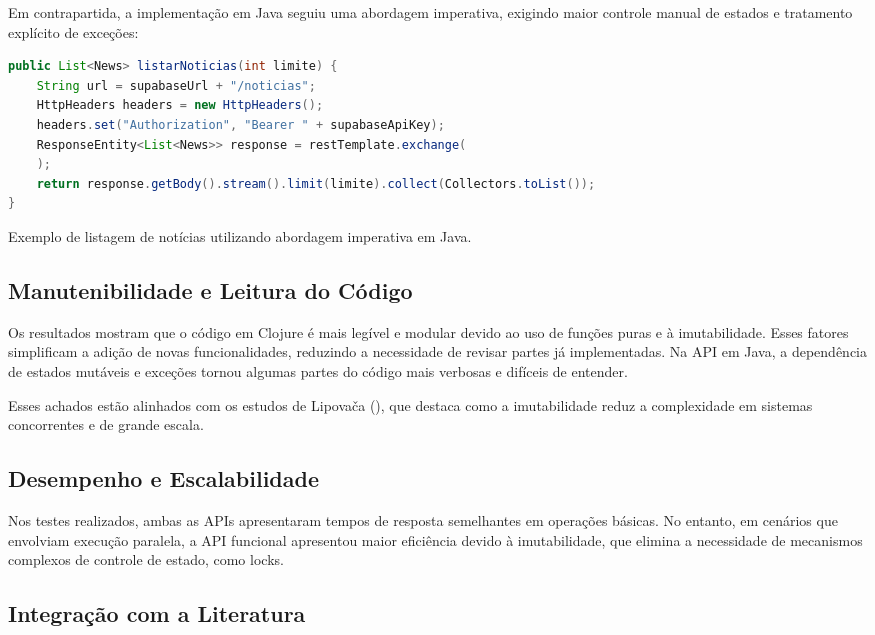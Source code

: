 Em contrapartida, a implementação em Java seguiu uma abordagem imperativa, exigindo maior controle manual de estados e tratamento explícito de exceções:

\begin{tcolorbox}[colback=gray!5!white, colframe=gray!75!black, title={Trecho de Código - Listagem de Notícias em Java}]
\begin{lstlisting}[language=Java]
public List<News> listarNoticias(int limite) {
    String url = supabaseUrl + "/noticias";
    HttpHeaders headers = new HttpHeaders();
    headers.set("Authorization", "Bearer " + supabaseApiKey);
    ResponseEntity<List<News>> response = restTemplate.exchange(
    );
    return response.getBody().stream().limit(limite).collect(Collectors.toList());
}
\end{lstlisting}
\caption{Exemplo de listagem de notícias utilizando abordagem imperativa em Java.}
\end{tcolorbox}

\subsection{Manutenibilidade e Leitura do Código}

Os resultados mostram que o código em Clojure é mais legível e modular devido ao uso de funções puras e à imutabilidade. Esses fatores simplificam a adição de novas funcionalidades, reduzindo a necessidade de revisar partes já implementadas. Na API em Java, a dependência de estados mutáveis e exceções tornou algumas partes do código mais verbosas e difíceis de entender.

Esses achados estão alinhados com os estudos de Lipovača (\citeyear{Lipovaca11}), que destaca como a imutabilidade reduz a complexidade em sistemas concorrentes e de grande escala.

\subsection{Desempenho e Escalabilidade}

Nos testes realizados, ambas as APIs apresentaram tempos de resposta semelhantes em operações básicas. No entanto, em cenários que envolviam execução paralela, a API funcional apresentou maior eficiência devido à imutabilidade, que elimina a necessidade de mecanismos complexos de controle de estado, como locks. 

\subsection{Integração com a Literatura}

